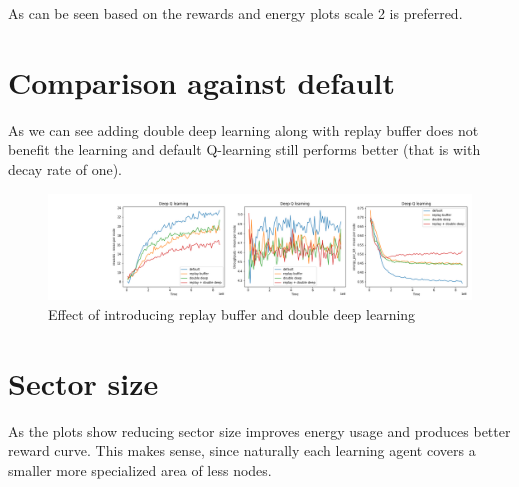 As can be seen based on the rewards and energy plots scale 2 is preferred.

\section{Comparison against default}

As we can see adding double deep learning along with
replay buffer does not benefit the learning and default
Q-learning still performs better (that is with decay
rate of one).

\begin{figure}[H]
\centering
\hspace*{-3.3cm}  
\includegraphics[scale=0.40]{plots/target_double_deep/replay_double_SMALL.png}
  \caption{Effect of introducing replay buffer and double deep learning}
\end{figure}

\section{Sector size}
As the plots show reducing sector size improves energy
usage and produces better reward curve. This makes sense,
since naturally each learning agent covers a smaller 
more specialized area of less nodes.
